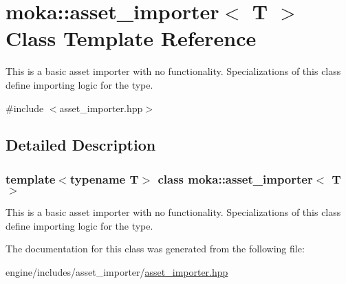 \hypertarget{classmoka_1_1asset__importer}{}\section{moka\+::asset\+\_\+importer$<$ T $>$ Class Template Reference}
\label{classmoka_1_1asset__importer}


This is a basic asset importer with no functionality. Specializations of this class define importing logic for the type.  




{\ttfamily \#include $<$asset\+\_\+importer.\+hpp$>$}



\subsection{Detailed Description}
\subsubsection*{template$<$typename T$>$\newline
class moka\+::asset\+\_\+importer$<$ T $>$}

This is a basic asset importer with no functionality. Specializations of this class define importing logic for the type. 

The documentation for this class was generated from the following file\+:\begin{DoxyCompactItemize}
\item 
engine/includes/asset\+\_\+importer/\mbox{\hyperlink{asset__importer_8hpp}{asset\+\_\+importer.\+hpp}}\end{DoxyCompactItemize}
